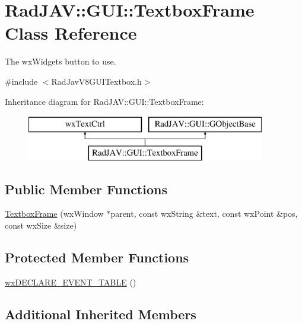 \hypertarget{class_rad_j_a_v_1_1_g_u_i_1_1_textbox_frame}{}\section{Rad\+J\+AV\+:\+:G\+UI\+:\+:Textbox\+Frame Class Reference}
\label{class_rad_j_a_v_1_1_g_u_i_1_1_textbox_frame}


The wx\+Widgets button to use.  




{\ttfamily \#include $<$Rad\+Jav\+V8\+G\+U\+I\+Textbox.\+h$>$}

Inheritance diagram for Rad\+J\+AV\+:\+:G\+UI\+:\+:Textbox\+Frame\+:\begin{figure}[H]
\begin{center}
\leavevmode
\includegraphics[height=2.000000cm]{class_rad_j_a_v_1_1_g_u_i_1_1_textbox_frame}
\end{center}
\end{figure}
\subsection*{Public Member Functions}
\begin{DoxyCompactItemize}
\item 
\mbox{\hyperlink{class_rad_j_a_v_1_1_g_u_i_1_1_textbox_frame_a49f40f0237e8a0f30a0be3bd803ddf23}{Textbox\+Frame}} (wx\+Window $\ast$parent, const wx\+String \&text, const wx\+Point \&pos, const wx\+Size \&size)
\end{DoxyCompactItemize}
\subsection*{Protected Member Functions}
\begin{DoxyCompactItemize}
\item 
\mbox{\hyperlink{class_rad_j_a_v_1_1_g_u_i_1_1_textbox_frame_a72d2ebc2a800e570783be33738c2d1a5}{wx\+D\+E\+C\+L\+A\+R\+E\+\_\+\+E\+V\+E\+N\+T\+\_\+\+T\+A\+B\+LE}} ()
\end{DoxyCompactItemize}
\subsection*{Additional Inherited Members}


